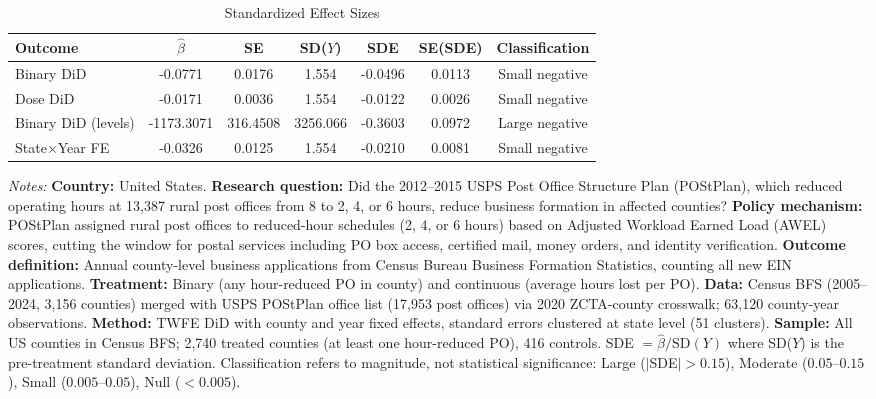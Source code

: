 \begin{table}[htbp]
\centering
\caption{Standardized Effect Sizes}
\label{tab:sde}
\begin{adjustbox}{max width=\textwidth}
\begin{tabular}{lcccccc}
\hline\hline
Outcome & $\hat{\beta}$ & SE & SD($Y$) & SDE & SE(SDE) & Classification \\
\hline
Binary DiD & -0.0771 & 0.0176 & 1.554 & -0.0496 & 0.0113 & Small negative \\
Dose DiD & -0.0171 & 0.0036 & 1.554 & -0.0122 & 0.0026 & Small negative \\
Binary DiD (levels) & -1173.3071 & 316.4508 & 3256.066 & -0.3603 & 0.0972 & Large negative \\
State×Year FE & -0.0326 & 0.0125 & 1.554 & -0.0210 & 0.0081 & Small negative \\
\hline\hline
\end{tabular}
\end{adjustbox}
\begin{tablenotes}[flushleft]\small
\item \textit{Notes:} \textbf{Country:} United States. \textbf{Research question:} Did the 2012--2015 USPS Post Office Structure Plan (POStPlan), which reduced operating hours at 13,387 rural post offices from 8 to 2, 4, or 6 hours, reduce business formation in affected counties? \textbf{Policy mechanism:} POStPlan assigned rural post offices to reduced-hour schedules (2, 4, or 6 hours) based on Adjusted Workload Earned Load (AWEL) scores, cutting the window for postal services including PO box access, certified mail, money orders, and identity verification. \textbf{Outcome definition:} Annual county-level business applications from Census Bureau Business Formation Statistics, counting all new EIN applications. \textbf{Treatment:} Binary (any hour-reduced PO in county) and continuous (average hours lost per PO). \textbf{Data:} Census BFS (2005--2024, 3,156 counties) merged with USPS POStPlan office list (17,953 post offices) via 2020 ZCTA-county crosswalk; 63,120 county-year observations. \textbf{Method:} TWFE DiD with county and year fixed effects, standard errors clustered at state level (51 clusters). \textbf{Sample:} All US counties in Census BFS; 2,740 treated counties (at least one hour-reduced PO), 416 controls. SDE $= \hat{\beta} / \text{SD}(Y)$ where SD($Y$) is the pre-treatment standard deviation. Classification refers to magnitude, not statistical significance: Large ($|$SDE$| > 0.15$), Moderate ($0.05$--$0.15$), Small ($0.005$--$0.05$), Null ($< 0.005$).
\end{tablenotes}
\end{table}
